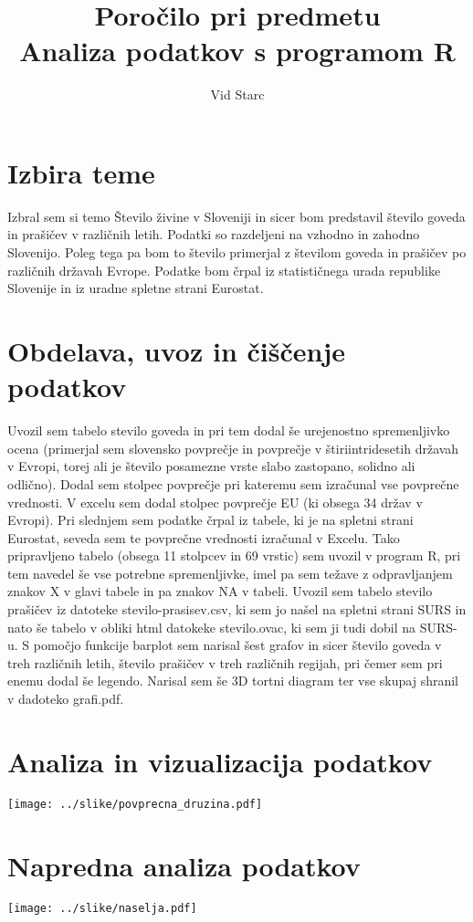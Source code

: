 \documentclass[11pt,a4paper]{article}
\begin{document}
\title{Poročilo pri predmetu \\
Analiza podatkov s programom R}
\author{Vid Starc}
\maketitle

\section{Izbira teme}
Izbral sem si temo Število živine v Sloveniji in sicer bom predstavil število goveda in prašičev v različnih letih. Podatki so razdeljeni na vzhodno in zahodno Slovenijo. Poleg tega pa bom to število primerjal z številom goveda in prašičev po različnih državah Evrope. Podatke bom črpal iz statističnega urada republike Slovenije in iz uradne spletne strani Eurostat.

\section{Obdelava, uvoz in čiščenje podatkov}
Uvozil sem tabelo stevilo goveda in pri tem dodal še urejenostno spremenljivko ocena (primerjal sem slovensko povprečje in povprečje v štiriintridesetih državah v Evropi, torej ali je število posamezne vrste slabo zastopano, solidno ali odlično). Dodal sem stolpec povprečje pri kateremu sem izračunal vse povprečne vrednosti. V excelu sem dodal stolpec povprečje EU (ki obsega 34 držav v Evropi). Pri slednjem sem podatke črpal iz tabele, ki je na spletni strani Eurostat, seveda sem te povprečne vrednosti izračunal v Excelu. Tako pripravljeno tabelo (obsega 11 stolpcev in 69 vrstic) sem uvozil v program R, pri tem navedel še vse potrebne spremenljivke, imel pa sem težave z odpravljanjem znakov X v glavi tabele in pa znakov NA v tabeli.
Uvozil sem tabelo stevilo prašičev iz datoteke stevilo-prasisev.csv, ki sem jo našel na spletni strani SURS in nato še tabelo v obliki html datokeke stevilo.ovac, ki sem ji tudi dobil na SURS-u.
S pomočjo funkcije barplot sem narisal šest grafov in sicer število goveda v treh različnih letih, število prašičev v treh različnih regijah, pri čemer sem pri enemu dodal še legendo. Narisal sem še 3D tortni diagram ter vse skupaj shranil v dadoteko grafi.pdf.

\section{Analiza in vizualizacija podatkov}

\texttt{[image: ../slike/povprecna\_druzina.pdf]}

\section{Napredna analiza podatkov}

\texttt{[image: ../slike/naselja.pdf]}
\end{document}
